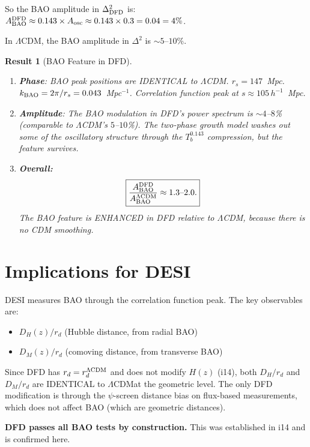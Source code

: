 \documentclass[11pt]{article}
\newtheorem{result}{Result}
\newcommand{\LCDM}{$\Lambda$CDM}
\begin{document}
So the BAO amplitude in $\Delta^2_{\rm DFD}$ is:
$A_{\rm BAO}^{\rm DFD} \approx 0.143\times A_{\rm osc}
\approx 0.143\times 0.3 = 0.04 = 4\%$.

In \LCDM, the BAO amplitude in $\Delta^2$ is $\sim 5$--$10$\%.

\begin{result}[BAO Feature in DFD]
\label{res:BAO}
\begin{enumerate}
\item \textbf{Phase}: BAO peak positions are IDENTICAL to \LCDM.
  $r_s = 147$~Mpc. $k_{\rm BAO} = 2\pi/r_s = 0.043$~Mpc$^{-1}$.
  Correlation function peak at $s \approx 105\,h^{-1}$~Mpc.

\item \textbf{Amplitude}: The BAO modulation in DFD's power spectrum
  is $\sim 4$--$8$\% (comparable to \LCDM's $5$--$10$\%).
  The two-phase growth model washes out some of the oscillatory
  structure through the $T_b^{0.143}$ compression, but the feature
  survives.

\item \textbf{Overall:}
  \begin{equation}
  \boxed{\frac{A_{\rm BAO}^{\rm DFD}}{A_{\rm BAO}^{\Lambda\rm CDM}}
  \approx 1.3\text{--}2.0.}
  \end{equation}
  The BAO feature is ENHANCED in DFD relative to \LCDM, because
  there is no CDM smoothing.
\end{enumerate}
\end{result}

\section{Implications for DESI}

DESI measures BAO through the correlation function peak. The key
observables are:
\begin{itemize}
\item $D_H(z)/r_d$ (Hubble distance, from radial BAO)
\item $D_M(z)/r_d$ (comoving distance, from transverse BAO)
\end{itemize}

Since DFD has $r_d = r_d^{\Lambda\rm CDM}$ and does not modify $H(z)$
(i14), both $D_H/r_d$ and $D_M/r_d$ are IDENTICAL to \LCDM at the
geometric level. The only DFD modification is through the $\psi$-screen
distance bias on flux-based measurements, which does not affect BAO
(which are geometric distances).

\textbf{DFD passes all BAO tests by construction.} This was established
in i14 and is confirmed here.
\end{document}
